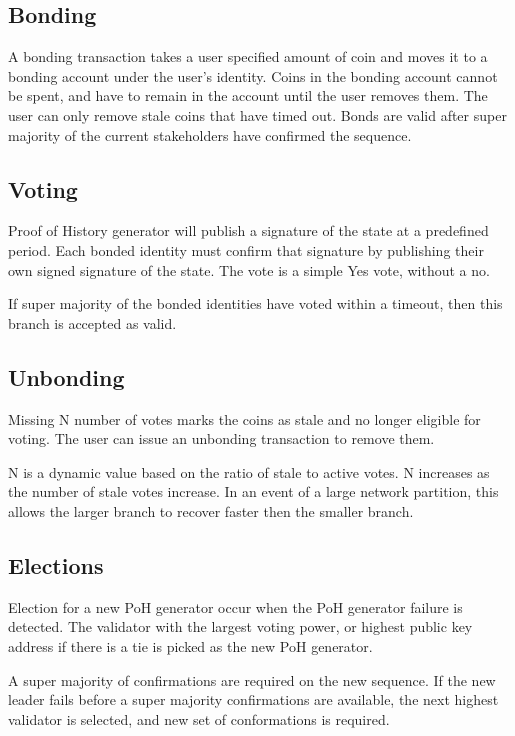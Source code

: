 \documentclass[12pt]{article}
\begin{document}
\subsection{Bonding}
A bonding transaction takes a user specified amount of coin and moves it to a bonding account under the user’s identity. Coins in the bonding account cannot be spent, and have to remain in the account until the user removes them. The user can only remove stale coins that have timed out. Bonds are valid after super majority of the current stakeholders have confirmed the sequence.

\subsection{Voting}
Proof of History generator will publish a signature of the state at a predefined period. Each bonded identity must confirm that signature by publishing their own signed signature of the state. The vote is a simple Yes vote, without a no.

If super majority of the bonded identities have voted within a timeout, then this branch is accepted as valid.

\subsection{Unbonding}

Missing N number of votes marks the coins as stale and no longer eligible for voting. The user can issue an unbonding transaction to remove them.

N is a dynamic value based on the ratio of stale to active votes.  N increases as the number of stale votes increase.  In an event of a large network partition, this allows the larger branch to recover faster then the smaller branch.

\subsection{Elections}\label{subsec:elections}
Election for a new PoH generator occur when the PoH generator failure is detected. The validator with the largest voting power, or highest public key address if there is a tie is picked as the new PoH generator.

A super majority of confirmations are required on the new sequence. If the new leader fails before a super majority confirmations are available, the next highest validator is selected, and new set of conformations is required.
\end{document}
